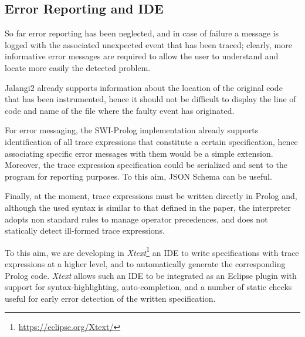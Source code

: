 
\subsection{Error Reporting and IDE}
So far error reporting has been neglected, and in case of failure a message is logged with the associated
unexpected event that has been traced; clearly, more informative error messages
are required to allow the user to understand and locate more easily the detected problem.

Jalangi2 already supports information about the location of the original code that has been
instrumented, hence it should not be difficult to display the line of code and name of the file where
the faulty event has originated.

For error messaging, the SWI-Prolog implementation already supports identification of
all trace expressions that constitute a certain specification, hence associating specific error messages with them
would be a simple extension.
Moreover, the trace expression specification could be serialized and sent to the program for reporting purposes.
To this aim, JSON Schema \cite{jsonschema} can be useful.

Finally, at the moment, trace expressions must be written directly in Prolog and, although the used syntax
is similar to that defined in the paper, the interpreter adopts non standard rules to manage operator precedences,
and does not statically detect ill-formed trace expressions.

To this aim, we are developing in \textit{Xtext}\footnote{\url{https://eclipse.org/Xtext/}} an IDE
to write specifications with trace expressions at a higher level, and to automatically generate
the corresponding Prolog code. \textit{Xtext} allows such an IDE to be integrated as an Eclipse plugin
with support for syntax-highlighting, auto-completion,
and a number of static checks useful for early error detection of the written specification.
